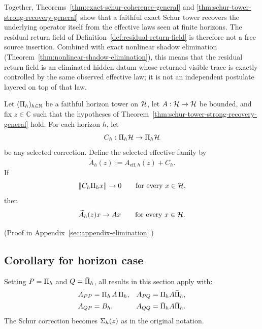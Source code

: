 \begin{remark}
\label{rem:faithful-recovery-residual-return}
Together, Theorems~\ref{thm:exact-schur-coherence-general}
and \ref{thm:schur-tower-strong-recovery-general} show that a faithful exact
Schur tower recovers the underlying operator itself from the effective laws
seen at finite horizons. The residual return field of
Definition~\ref{def:residual-return-field} is therefore not a free source
insertion. Combined with exact nonlinear shadow elimination
(Theorem~\ref{thm:nonlinear-shadow-elimination}), this means that the residual
return field is an eliminated hidden datum whose returned visible trace is
exactly controlled by the same observed effective law; it is not an independent
postulate layered on top of that law.
\end{remark}

\begin{theorem}
\label{thm:selected-schur-recovery-general}
Let $(\CCPi{h})_{h\in\bbN}$ be a faithful horizon tower on $\cH$, let
$A:\cH\to\cH$ be bounded, and fix
$z\in\mathbb{C}$ such that the hypotheses of
Theorem~\ref{thm:schur-tower-strong-recovery-general} hold. For each horizon
$h$, let
\[
C_h:\CCPi{h}\cH\to\CCPi{h}\cH
\]
be any selected correction. Define the selected effective family by
\[
\widetilde A_h(z):=A_{\mathrm{eff},h}(z)+C_h.
\]
If
\[
\|C_h\CCPi{h}x\|\to 0
\qquad\text{for every }x\in\cH,
\]
then
\[
\widetilde A_h(z)x\to Ax
\qquad\text{for every }x\in\cH.
\]
\end{theorem}

(Proof in Appendix~\ref{sec:appendix-elimination}.)

\subsection{Corollary for horizon case}

\begin{corollary}
\label{cor:horizon-specialization}
Setting $P = \CCPi{h}$ and $\CCComp = \CCPibar{h}$, all results in this section apply with:
\begin{align*}
\CCBlockPP{A} &= \CCRestr{A}{h}, & \CCBlockPQ{A} &= \CCPi{h} A \CCPibar{h}, \\
\CCBlockQP{A} &= \CCLeak{A}{h}, & \CCBlockQQ{A} &= \CCPibar{h} A \CCPibar{h}.
\end{align*}
The Schur correction becomes $\CCSigma{h}{z}$ as in the original notation.
\end{corollary}

